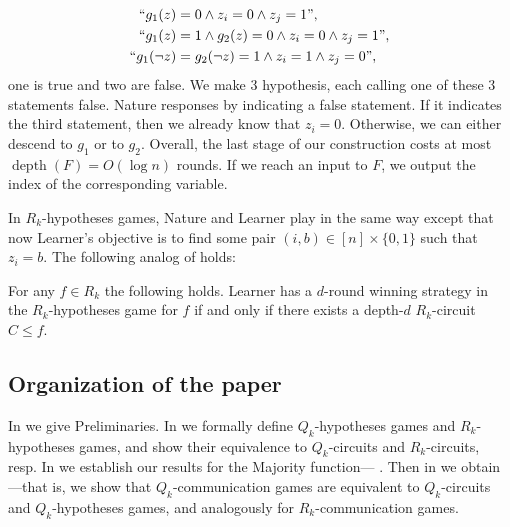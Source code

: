 \documentclass{toc}
\DeclareMathOperator{\depth}{depth}  %
\begin{document}
\begin{align*}
``g_1(z) &= 0\land z_i = 0 \land z_j = 1\mbox{''}, \\
``g_1(z) &= 1 \land g_2(z) = 0\land z_i = 0 \land z_j = 1\mbox{''}, \\
``g_1(\lnot z) &= g_2(\lnot z) = 1 \land z_i = 1 \land z_j = 0\mbox{''}, \\
\end{align*}
one is true and two are false. We make 3 hypothesis, each calling one of these 3 statements false. Nature responses by indicating a false statement. If it indicates the third statement, then we already know that $z_i = 0$. Otherwise, we can either descend to $g_1$ or to $g_2$. Overall, the last stage of our construction costs at most $\depth(F) = O(\log n)$ rounds. If we reach an input to $F$, we output the index of the corresponding variable. 

\medskip

In $R_k$-hypotheses games, Nature and Learner play in the same way except that now Learner's objective is to find some pair $(i, b) \in [n] \times \{0, 1\}$ such that $z_i =b$.  The following analog of  holds:
\begin{proposition}
\label{games_R_k}
For any $f\in R_k$ the following holds. Learner has a $d$-round winning strategy in the $R_k$-hypotheses game for $f$ if and only if there exists a
depth-$d$ $R_k$-circuit $C\le f$.
\end{proposition}

\subsection{Organization of the paper}

In  we give Preliminaries. 
In  we
formally  %
define $Q_k$-hypotheses 
%
games and $R_k$-hypotheses games,  %
%
and
show their equivalence to $Q_k$-circuits
%
and $R_k$-circuits, resp.  %
In  we establish our results for the Majority
%
function---    %
.
Then in  we obtain  %
 ---that 
is, we show that
%
%
%
%
%
%
$Q_k$-communication games are
equivalent to $Q_k$-circuits and $Q_k$-hypotheses games,
and analogously for $R_k$-communication games.   %
\end{document}
